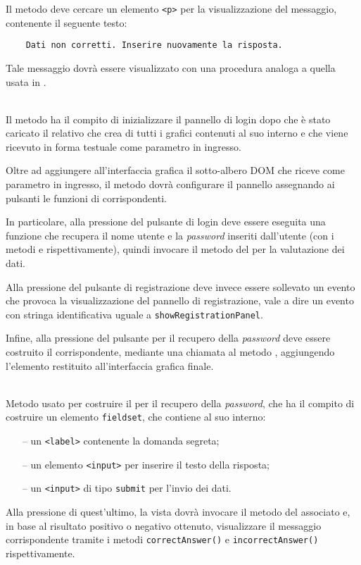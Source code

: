 \begin{description}
	Il metodo deve cercare un elemento \verb'<p>' per la visualizzazione del messaggio, contenente il seguente testo:
\begin{verbatim}
	Dati non corretti. Inserire nuovamente la risposta.
\end{verbatim}
	
	Tale messaggio dovrà essere visualizzato con una procedura analoga a quella usata in .

	\item{}\\
	Il metodo ha il compito di inizializzare il pannello di login dopo che è stato caricato il relativo  che crea di tutti i  grafici contenuti al suo interno e che viene ricevuto in forma testuale come parametro in ingresso.
	
	Oltre ad aggiungere all'interfaccia grafica il sotto-albero DOM che riceve come parametro in ingresso, il metodo dovrà configurare il pannello assegnando ai pulsanti le funzioni di  corrispondenti.
	
	In particolare, alla pressione del pulsante di login deve essere eseguita una funzione che recupera il nome utente e la \textit{password} inseriti dall'utente (con i metodi  e  rispettivamente), quindi invocare il metodo  del  per la valutazione dei dati.
	
	Alla pressione del pulsante di registrazione deve invece essere sollevato un evento che provoca la visualizzazione del pannello di registrazione, vale a dire un evento con stringa identificativa uguale a \verb'showRegistrationPanel'.
	
	Infine, alla pressione del pulsante per il recupero della \textit{password} deve essere costruito il  corrispondente, mediante una chiamata al metodo , aggiungendo l'elemento restituito all'interfaccia grafica finale.
	
	\item{}\\
	Metodo usato per costruire il  per il recupero della \textit{password}, che ha il compito di costruire un elemento \verb'fieldset', che contiene al suo interno:
	\begin{itemize}
	  \item[--] un \verb'<label>' contenente la domanda segreta;
	  \item[--] un elemento \verb'<input>' per inserire il testo della risposta;
	  \item[--] un \verb'<input>' di tipo \verb'submit' per l'invio dei dati.
	\end{itemize}
Alla pressione di quest'ultimo, la vista dovrà invocare il metodo  del  associato e, in base al risultato positivo o negativo ottenuto, visualizzare il messaggio corrispondente tramite i metodi \verb'correctAnswer()' e \verb'incorrectAnswer()' rispettivamente.


\end{description}
